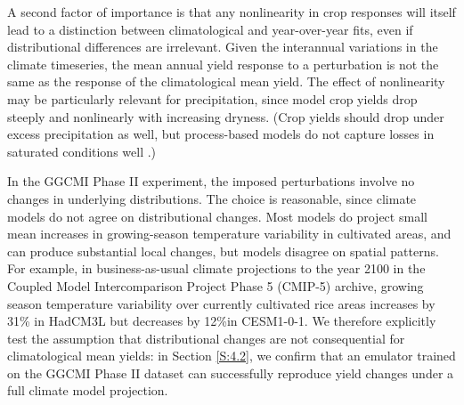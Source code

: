 \documentclass[gmd, manuscript]{copernicus} %
\begin{document}
A second factor of importance is that any nonlinearity in crop responses will itself lead to a distinction between climatological and year-over-year fits, even if distributional differences are irrelevant. 
Given the interannual variations in the climate timeseries, the mean annual yield response to a perturbation is not the same as the response of the climatological mean yield. 
The effect of nonlinearity may be particularly relevant for precipitation, since model crop yields drop steeply and nonlinearly with increasing dryness. 
(Crop yields should drop under excess precipitation as well, but process-based models do not capture losses in saturated conditions well \citep[e.g.][]{Glotter15,Li2019}.) 

In the GGCMI Phase II experiment, the imposed perturbations involve no changes in underlying distributions. %
The choice is reasonable, since climate models do not agree on distributional changes.
Most models do project small mean increases in growing-season temperature variability in cultivated areas, and can produce substantial local changes, but models disagree on spatial patterns.
For example, in business-as-usual climate projections to the year 2100 in the Coupled Model Intercomparison Project Phase 5 (CMIP-5) archive, growing season temperature variability over currently cultivated rice areas increases by 31\% in HadCM3L but decreases by 12\%in CESM1-0-1. 
We therefore explicitly test the assumption that distributional changes are not consequential for climatological mean yields: in Section \ref{S:4.2}, we confirm that an emulator trained on the GGCMI Phase II dataset can successfully reproduce yield changes under a full climate model projection.
\end{document}
